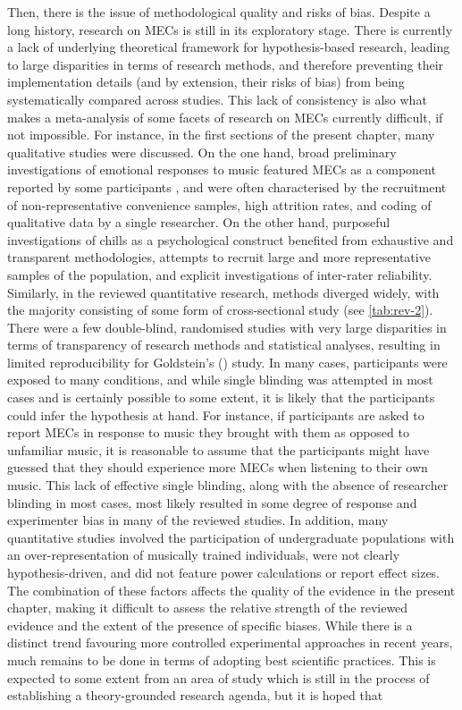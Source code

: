 Then, there is the issue of methodological quality and risks of bias. Despite a long history, research on MECs is still in its exploratory stage. There is currently a lack of underlying theoretical framework for hypothesis-based research, leading to large disparities in terms of research methods, and therefore preventing their implementation details (and by extension, their risks of bias) from being systematically compared across studies. This lack of consistency is also what makes a meta-analysis of some facets of research on MECs currently difficult, if not impossible. For instance, in the first sections of the present chapter, many qualitative studies were discussed. On the one hand, broad preliminary investigations of emotional responses to music featured MECs as a component reported by some participants \parencite[e.g.,][]{panzarella1980, scherer2001, sloboda1991}, and were often characterised by the recruitment of non-representative convenience samples, high attrition rates, and coding of qualitative data by a single researcher. On the other hand, purposeful investigations of chills as a psychological construct \parencite[e.g.,][]{bannister2020a, maruskin2012} benefited from exhaustive and transparent methodologies, attempts to recruit large and more representative samples of the population, and explicit investigations of inter-rater reliability. Similarly, in the reviewed quantitative research, methods diverged widely, with the majority consisting of some form of cross-sectional study (see \autoref{tab:rev-2}). There were a few double-blind, randomised studies \parencite[e.g.,][]{ferreri2019, goldstein1980} with very large disparities in terms of transparency of research methods and statistical analyses, resulting in limited reproducibility for Goldstein’s (\citeyear{goldstein1980}) study. In many cases, participants were exposed to many conditions, and while single blinding was attempted in most cases and is certainly possible to some extent, it is likely that the participants could infer the hypothesis at hand. For instance, if participants are asked to report MECs in response to music they brought with them as opposed to unfamiliar music, it is reasonable to assume that the participants might have guessed that they should experience more MECs when listening to their own music. This lack of effective single blinding, along with the absence of researcher blinding in most cases, most likely resulted in some degree of response and experimenter bias in many of the reviewed studies. In addition, many quantitative studies involved the participation of undergraduate populations with an over-representation of musically trained individuals, were not clearly hypothesis-driven, and did not feature power calculations or report effect sizes. The combination of these factors affects the quality of the evidence in the present chapter, making it difficult to assess the relative strength of the reviewed evidence and the extent of the presence of specific biases. While there is a distinct trend favouring more controlled experimental approaches in recent years, much remains to be done in terms of adopting best scientific practices. This is expected to some extent from an area of study which is still in the process of establishing a theory-grounded research agenda, but it is hoped that 